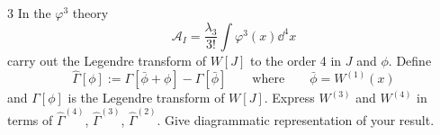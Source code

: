 \begin{hwproblem}{3}\label{hw:3}
In the $\varphi^3$ theory
\[
\mathcal A_I=\frac{\lambda_3}{3!}\int\varphi^3(x)\dd^4x
\]
carry out the Legendre transform of $W[J]$ to the order 4 in $J$ and $\phi$.
Define
\[
\hat\Gamma[\phi]:=\Gamma[\bar\phi+\phi]-\Gamma[\bar\phi]
\qquad\text{where}\qquad \bar\phi=W^{(1)}(x)
\]
and $\Gamma[\phi]$ is the Legendre transform of $W[J]$. Express $W^{(3)}$ and
$W^{(4)}$ in terms of $\hat\Gamma^{(4)}$, $\hat\Gamma^{(3)}$, $\hat\Gamma^{(2)}$.
Give diagrammatic representation of your result.
\end{hwproblem}
